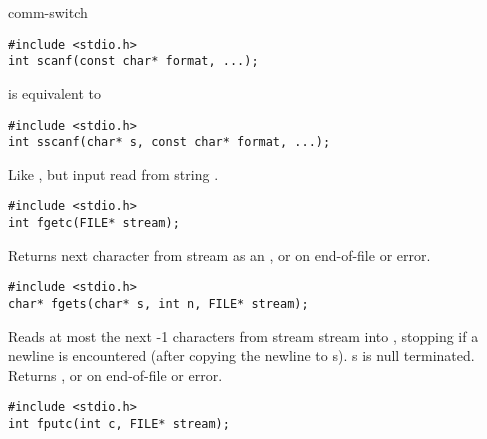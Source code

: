 \begin{Ventry2}{comm-switch  }
\item[scanf]
\label{item:scanf}
\begin{production}
\begin{verbatim}
#include <stdio.h>
int scanf(const char* format, ...);
\end{verbatim}
\end{production}

      is equivalent to 

\item[sscanf]
\label{item:sscanf}
\begin{production}
\begin{verbatim}
#include <stdio.h>
int sscanf(char* s, const char* format, ...);
\end{verbatim}
\end{production}

     Like , but input read from string .

\item[fgetc]
\label{item:fgetc}
\begin{production}
\begin{verbatim}
#include <stdio.h>
int fgetc(FILE* stream);
\end{verbatim}
\end{production}

     Returns next character from stream  as an 
     , or  on end-of-file or error.

\item[fgets]
\label{item:fgets}
\begin{production}
\begin{verbatim}
#include <stdio.h>
char* fgets(char* s, int n, FILE* stream);
\end{verbatim}
\end{production}

     Reads at most the next -1 characters from stream stream into , stopping
     if a newline is encountered (after copying the newline to s). s is
     null terminated. Returns , or  on end-of-file or error.

\item[fputc]
\label{item:fputc}
\begin{production}
\begin{verbatim}
#include <stdio.h>
int fputc(int c, FILE* stream);
\end{verbatim}
\end{production}


\end{Ventry2}
